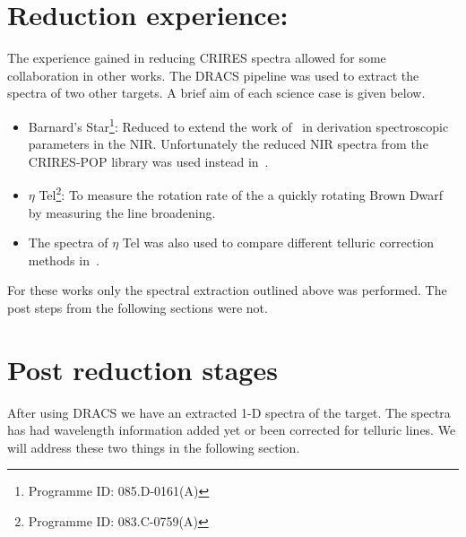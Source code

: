 \section{Reduction experience:}
The experience gained in reducing CRIRES spectra allowed for some collaboration in other works. The DRACS pipeline was used to extract the spectra of two other targets. A brief aim of each science case is given below.
\begin{itemize}
\item Barnard's Star\footnote{Programme ID: 085.D-0161(A)}: Reduced to extend the work of~\citet{andreasen_nearinfrared_2016} in derivation spectroscopic parameters in the NIR. Unfortunately the reduced NIR spectra from the CRIRES-POP library was used instead in~\citet{Andreasen et al. (in prep.)}. 
\item $\eta$ Tel\footnote{Programme ID: 083.C-0759(A)}: To measure the rotation rate of the a quickly rotating Brown Dwarf by measuring the line broadening. 
\item The spectra of $\eta$ Tel was also used to compare different telluric correction methods in~\cite{ulmer-moll_telluric_2018}.
\end{itemize}

For these works only the spectral extraction outlined above was performed. The post  steps from the following sections were not.



\section{Post reduction stages}
\label{sec:posreduction}
After using DRACS we have an extracted 1-D spectra of the target. The spectra has had wavelength information added yet or been corrected for telluric lines. We will address these two things in the following section.

